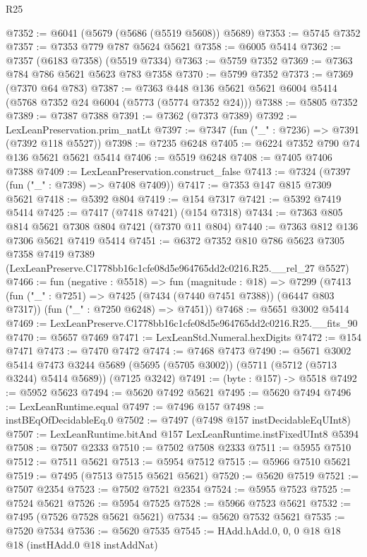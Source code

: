 \begin{lexlean}{R25}
\begin{coremodule}
@7352 := @6041 (@5679 (@5686 (@5519 @5608)) @5689)
@7353 := @5745 @7352
@7357 := @7353 @779 @787 @5624 @5621
@7358 := @6005 @5414
@7362 := @7357 (@6183 @7358) (@5519 @7334)
@7363 := @5759 @7352
@7369 := @7363 @784 @786 @5621 @5623 @783 @7358
@7370 := @5799 @7352
@7373 := @7369 (@7370 @64 @783)
@7387 := @7363 @448 @136 @5621 @5621 @6004 @5414 (@5768 @7352 @24 @6004 (@5773 (@5774 @7352 @24)))
@7388 := @5805 @7352
@7389 := @7387 @7388
@7391 := @7362 (@7373 @7389)
@7392 := LexLeanPreservation.prim_natLt
@7397 := @7347 (fun ("_" : @7236) => @7391 (@7392 @118 @5527))
@7398 := @7235 @6248
@7405 := @6224 @7352 @790 @74 @136 @5621 @5621 @5414
@7406 := @5519 @6248
@7408 := @7405 @7406 @7388
@7409 := LexLeanPreservation.construct_false
@7413 := @7324 (@7397 (fun ("_" : @7398) => @7408 @7409))
@7417 := @7353 @147 @815 @7309 @5621
@7418 := @5392 @804
@7419 := @154 @7317
@7421 := @5392 @7419 @5414
@7425 := @7417 (@7418 @7421) (@154 @7318)
@7434 := @7363 @805 @814 @5621 @7308 @804 @7421 (@7370 @11 @804)
@7440 := @7363 @812 @136 @7306 @5621 @7419 @5414
@7451 := @6372
    @7352
    @810
    @786
    @5623
    @7305
    @7358
    @7419
    @7389
    (LexLeanPreserve.C1778bb16c1cfe08d5e964765dd2c0216.R25.__rel_27 @5527)
@7466 := fun (negative : @5518) =>
  fun (magnitude : @18) =>
  @7299
    (@7413
      (fun ("_" : @7251) => @7425 (@7434 (@7440 @7451 @7388)) (@6447 @803 @7317))
      (fun ("_" : @7250 @6248) => @7451))
@7468 := @5651 @3002 @5414
@7469 := LexLeanPreserve.C1778bb16c1cfe08d5e964765dd2c0216.R25.__fits_90
@7470 := @5657 @7469
@7471 := LexLeanStd.Numeral.hexDigits
@7472 := @154 @7471
@7473 := @7470 @7472
@7474 := @7468 @7473
@7490 := @5671
    @3002
    @5414
    @7473
    @3244
    @5689
    (@5695 (@5705 @3002))
    (@5711 (@5712 (@5713 @3244) @5414 @5689))
    (@7125 @3242)
@7491 := (byte : @157) -> @5518
@7492 := @5952 @5623
@7494 := @5620 @7492 @5621
@7495 := @5620 @7494
@7496 := LexLeanRuntime.equal
@7497 := @7496 @157
@7498 := instBEqOfDecidableEq.{0}
@7502 := @7497 (@7498 @157 instDecidableEqUInt8)
@7507 := LexLeanRuntime.bitAnd @157 LexLeanRuntime.instFixedUInt8 @5394
@7508 := @7507 @2333
@7510 := @7502 @7508 @2333
@7511 := @5955 @7510
@7512 := @7511 @5621
@7513 := @5954 @7512
@7515 := @5966 @7510 @5621
@7519 := @7495 (@7513 @7515 @5621 @5621)
@7520 := @5620 @7519
@7521 := @7507 @2354
@7523 := @7502 @7521 @2354
@7524 := @5955 @7523
@7525 := @7524 @5621
@7526 := @5954 @7525
@7528 := @5966 @7523 @5621
@7532 := @7495 (@7526 @7528 @5621 @5621)
@7534 := @5620 @7532 @5621
@7535 := @7520 @7534
@7536 := @5620 @7535
@7545 := HAdd.hAdd.{0, 0, 0} @18 @18 @18 (instHAdd.{0} @18 instAddNat)

\end{coremodule}
\end{lexlean}
